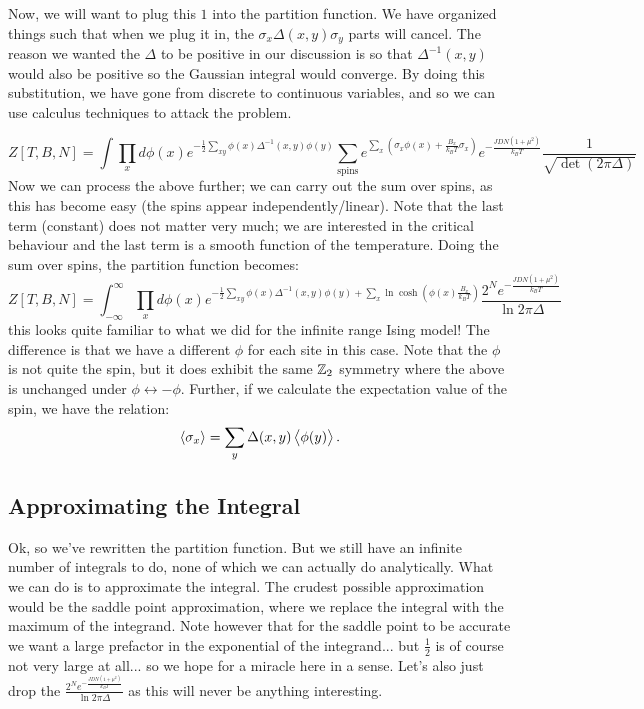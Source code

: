 Now, we will want to plug this $1$ into the partition function. We have organized things such that when we plug it in, the $\sigma_x\Delta(x, y)\sigma_y$ parts will cancel. The reason we wanted the $\Delta$ to be positive in our discussion is so that $\Delta^{-1}(x, y)$ would also be positive so the Gaussian integral would converge. By doing this substitution, we have gone from discrete to continuous variables, and so we can use calculus techniques to attack the problem.

\begin{equation}
    Z[T, B, N] = \int \prod_x d\phi(x) e^{-\frac{1}{2}\sum_{xy}\phi(x)\Delta^{-1}(x, y)\phi(y)}\sum_{\text{spins}}e^{\sum_x\left(\sigma_x\phi(x) + \frac{B_x}{k_B T}\sigma_x\right)}e^{-\frac{JDN(1+\mu^2)}{k_B T}}\frac{1}{\sqrt{\det(2\pi\Delta)}}
\end{equation}
Now we can process the above further; we can carry out the sum over spins, as this has become easy (the spins appear independently/linear). Note that the last term (constant) does not matter very much; we are interested in the critical behaviour and the last term is a smooth function of the temperature. Doing the sum over spins, the partition function becomes:
\begin{equation}
    Z[T, B, N] = \int_{-\infty}^\infty \prod_x d\phi(x) e^{-\frac{1}{2}\sum_{xy}\phi(x)\Delta^{-1}(x, y)\phi(y) + \sum_x \ln\cosh(\phi(x)\frac{B_x}{k_B T})}\frac{2^Ne^{-\frac{JDN(1+\mu^2)}{k_B T}}}{\ln 2\pi \Delta}
\end{equation}
this looks quite familiar to what we did for the infinite range Ising model! The difference is that we have a different $\phi$ for each site in this case. Note that the $\phi$ is not quite the spin, but it does exhibit the same $\mathbb{Z}_2$ symmetry where the above is unchanged under $\phi \leftrightarrow -\phi$. Further, if we calculate the expectation value of the spin, we have the relation:
\begin{equation}
    \avg{\sigma_x} = \sum_y \Delta(x, y)\avg{\phi(y)}.
\end{equation}

\subsection{Approximating the Integral}
Ok, so we've rewritten the partition function. But we still have an infinite number of integrals to do, none of which we can actually do analytically. What we can do is to approximate the integral. The crudest possible approximation would be the saddle point approximation, where we replace the integral with the maximum of the integrand. Note however that for the saddle point to be accurate we want a large prefactor in the exponential of the integrand... but $\frac{1}{2}$ is of course not very large at all... so we hope for a miracle here in a sense. Let's also just drop the $\frac{2^Ne^{-\frac{JDN(1+\mu^2)}{k_B T}}}{\ln 2\pi \Delta}$ as this will never be anything interesting.

